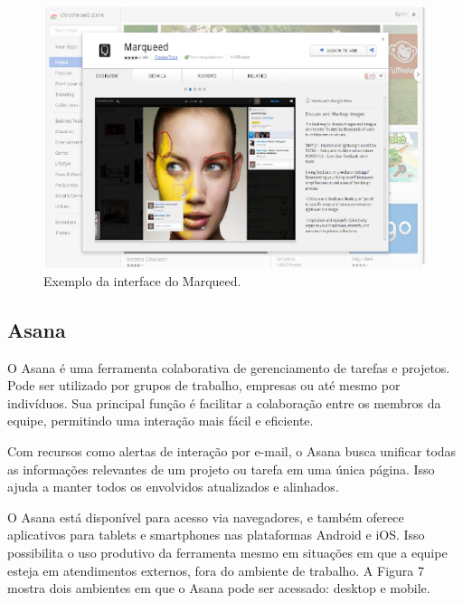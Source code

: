 \begin{figure}[htb]
	\caption{\label{fig:Fig_6}Exemplo da interface do Marqueed.}
	\begin{center}
		\includegraphics{figuras/Imagem6.png}
	\end{center}
\end{figure}

\subsection{Asana}
O Asana é uma ferramenta colaborativa de gerenciamento de tarefas e projetos. Pode ser utilizado por grupos de trabalho, empresas ou até mesmo por indivíduos. Sua principal função é facilitar a colaboração entre os membros da equipe, permitindo uma interação mais fácil e eficiente.

Com recursos como alertas de interação por e-mail, o Asana busca unificar todas as informações relevantes de um projeto ou tarefa em uma única página. Isso ajuda a manter todos os envolvidos atualizados e alinhados.

O Asana está disponível para acesso via navegadores, e também oferece aplicativos para tablets e smartphones nas plataformas Android e iOS. Isso possibilita o uso produtivo da ferramenta mesmo em situações em que a equipe esteja em atendimentos externos, fora do ambiente de trabalho. A Figura 7 mostra dois ambientes em que o Asana pode ser acessado: desktop e mobile.

